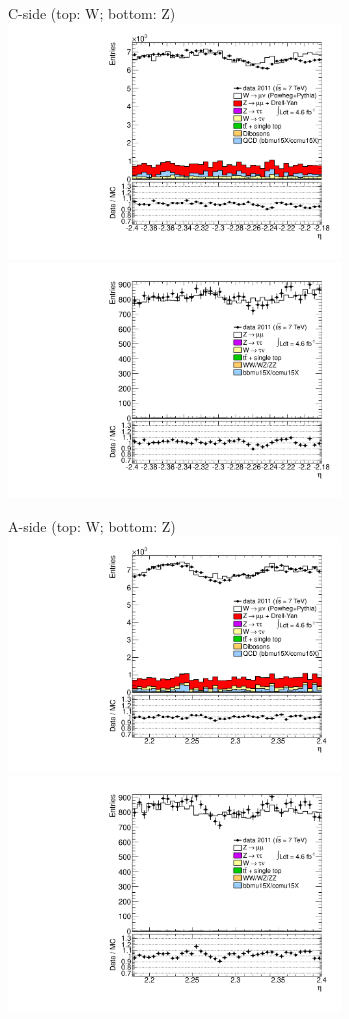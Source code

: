 {

\colb[T]

C-side (top: W; bottom: Z)
\centering
\includegraphics[width=0.66\textwidth]{dates/20130306/figures/etaphi/W_11_C_stack_l_eta_NEG} \\
\includegraphics[width=0.66\textwidth]{dates/20130306/figures/etaphi/Z_11_C_stack_lN_eta_ALL.pdf}

A-side (top: W; bottom: Z)
\centering
\includegraphics[width=0.66\textwidth]{dates/20130306/figures/etaphi/W_11_A_stack_l_eta_NEG} \\
\includegraphics[width=0.66\textwidth]{dates/20130306/figures/etaphi/Z_11_A_stack_lN_eta_ALL.pdf} 

\cole
}


